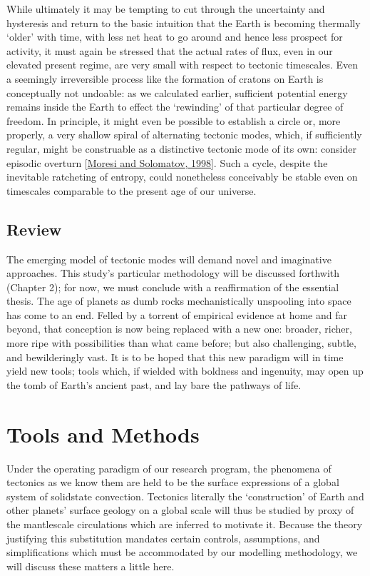 \documentclass[letterpaper,10pt,english]{jupyterBook}
\begin{document}
\sphinxAtStartPar
While ultimately it may be tempting to cut through the uncertainty and hysteresis and return to the basic intuition that the Earth is becoming thermally ‘older’ with time, with less net heat to go around and hence less prospect for activity, it must again be stressed that the actual rates of flux, even in our elevated present regime, are very small with respect to tectonic timescales. Even a seemingly irreversible process like the formation of cratons on Earth is conceptually not undoable: as we calculated earlier, sufficient potential energy remains inside the Earth to effect the ‘rewinding’ of that particular degree of freedom. In principle, it might even be possible to establish a circle \sphinxhyphen{} or, more properly, a very shallow spiral \sphinxhyphen{} of alternating tectonic modes, which, if sufficiently regular, might be construable as a distinctive tectonic mode of its own: consider episodic overturn {[}\hyperlink{cite.references:id401}{Moresi and Solomatov, 1998}{]}. Such a cycle, despite the inevitable ratcheting of entropy, could nonetheless conceivably be stable even on timescales comparable to the present age of our universe.


\section{Review}
\label{\detokenize{content/chapter_01_background/main:review}}
\sphinxAtStartPar
The emerging model of tectonic modes will demand novel and imaginative approaches. This study’s particular methodology will be discussed forthwith (Chapter 2); for now, we must conclude with a reaffirmation of the essential thesis. The age of planets as dumb rocks mechanistically unspooling into space has come to an end. Felled by a torrent of empirical evidence at home and far beyond, that conception is now being replaced with a new one: broader, richer, more ripe with possibilities than what came before; but also challenging, subtle, and bewilderingly vast. It is to be hoped that this new paradigm will in time yield new tools; tools which, if wielded with boldness and ingenuity, may open up the tomb of Earth’s ancient past, and lay bare the pathways of life.


\chapter{Tools and Methods}
\label{\detokenize{content/chapter_02_methods/intro:tools-and-methods}}\label{\detokenize{content/chapter_02_methods/intro::doc}}
\sphinxAtStartPar
Under the operating paradigm of our research program, the phenomena of tectonics as we know them are held to be the surface expressions of a global system of solid\sphinxhyphen{}state convection. Tectonics \sphinxhyphen{} literally the ‘construction’ of Earth and other planets’ surface geology on a global scale \sphinxhyphen{} will thus be studied by proxy of the mantle\sphinxhyphen{}scale circulations which are inferred to motivate it. Because the theory justifying this substitution mandates certain controls, assumptions, and simplifications which must be accommodated by our modelling methodology, we will discuss these matters a little here.
\end{document}
